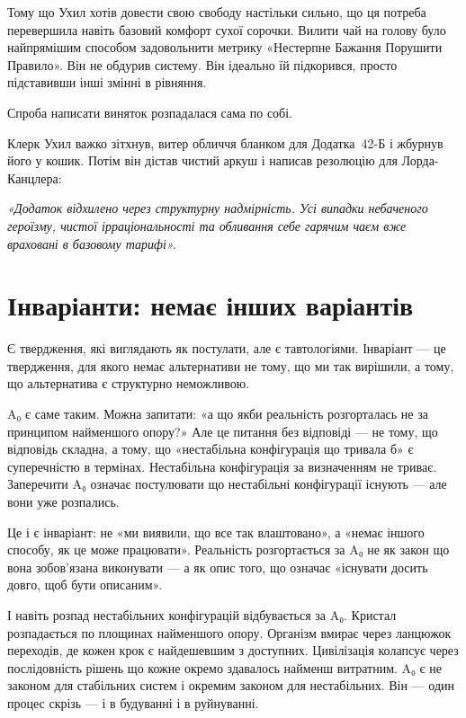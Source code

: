 \documentclass[12pt, a4paper, openany]{book}
\begin{document}
\begin{terrybox}
Тому що Ухил хотів довести свою свободу настільки сильно, що ця потреба перевершила навіть базовий комфорт сухої сорочки. Вилити чай на голову було найпрямішим способом задовольнити метрику «Нестерпне Бажання Порушити Правило». Він не обдурив систему. Він ідеально їй підкорився, просто підставивши інші змінні в рівняння.

Спроба написати виняток розпадалася сама по собі.

Клерк Ухил важко зітхнув, витер обличчя бланком для Додатка~42-Б і жбурнув його у кошик. Потім він дістав чистий аркуш і написав резолюцію для Лорда-Канцлера:

\medskip
\begin{center}\textit{«Додаток відхилено через структурну надмірність. Усі випадки небаченого героїзму, чистої ірраціональності та обливання себе гарячим чаєм вже враховані в базовому тарифі».}\end{center}
\end{terrybox}

\section{Інваріанти: немає інших варіантів}

Є твердження, які виглядають як постулати, але є тавтологіями. Інваріант — це твердження, для якого немає альтернативи не тому, що ми так вирішили, а тому, що альтернатива є структурно неможливою.

A₀ є саме таким. Можна запитати: «а що якби реальність розгорталась не за принципом найменшого опору?» Але це питання без відповіді — не тому, що відповідь складна, а тому, що «нестабільна конфігурація що тривала б» є суперечністю в термінах. Нестабільна конфігурація за визначенням не триває. Заперечити A₀ означає постулювати що нестабільні конфігурації існують — але вони уже розпались.

Це і є інваріант: не «ми виявили, що все так влаштовано», а «немає іншого способу, як це може працювати». Реальність розгортається за A₀ не як закон що вона зобов'язана виконувати — а як опис того, що означає «існувати досить довго, щоб бути описаним».

І навіть розпад нестабільних конфігурацій відбувається за A₀. Кристал розпадається по площинах найменшого опору. Організм вмирає через ланцюжок переходів, де кожен крок є найдешевшим з доступних. Цивілізація колапсує через послідовність рішень що кожне окремо здавалось найменш витратним. A₀ є не законом для стабільних систем і окремим законом для нестабільних. Він — один процес скрізь — і в будуванні і в руйнуванні.
\end{document}
